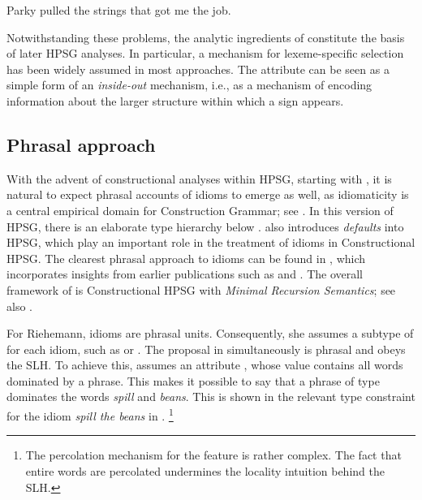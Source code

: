 \documentclass[output=paper,biblatex,babelshorthands,newtxmath,draftmode,colorlinks,citecolor=brown]{langscibook}
\begin{document}
\ea \label{strings-relcl}
Parky pulled the strings that got me the job.
\citep[137]{McCawley:81}
\z 

\noindent
Notwithstanding these problems, the analytic ingredients of \citet{KE94a} constitute the basis of
later HPSG analyses. In particular, a mechanism for lexeme-specific selection has been widely
assumed in most approaches. The attribute  can be seen as a simple form of an
\emph{inside-out} mechanism, i.e., as a mechanism of encoding information
about the larger structure within which a sign appears.
%

\subsection{Phrasal approach}
\label{Sec-Phrasal}

\largerpage[1]
%
With the advent of constructional analyses within HPSG, starting with
\citet{Sag97a}, it is natural to expect phrasal accounts of idioms to emerge as well, as
idiomaticity is a central empirical domain for Construction Grammar\indexcxg; see
.  In this version of HPSG, there is an elaborate type hierarchy below
.  \citet{Sag97a} also introduces \emph{defaults} into HPSG, which play an
important role in the treatment of idioms in Constructional HPSG.  The clearest phrasal approach to
idioms can be found in \citet{Riehemann2001a}, which incorporates insights from earlier publications
such as \citet{Riehemann97a} and \citet{RB99a}.
%
The overall framework of \citet{Riehemann2001a} is Constructional HPSG with \emph{Minimal Recursion Semantics}\indexmrs  \citep{CFMRS95a-u,CFPS2005a}; see also .

\begin{sloppypar}
For Riehemann, idioms are phrasal units.  Consequently, she assumes a subtype of  for each idiom, such as  or .  The proposal in \citet{Riehemann2001a} simultaneously is phrasal and obeys the SLH. To achieve this, \citet{Riehemann2001a} assumes an attribute , whose value contains all words dominated by a phrase. This makes it possible to say that a phrase of type  dominates the words \emph{spill} and \emph{beans}. This is shown in the relevant type constraint for the idiom \emph{spill the beans} in .%
\footnote{The percolation mechanism for the feature  is rather complex. 
The fact that entire words are percolated undermines the locality intuition behind the SLH.
}
\end{sloppypar}
\end{document}
